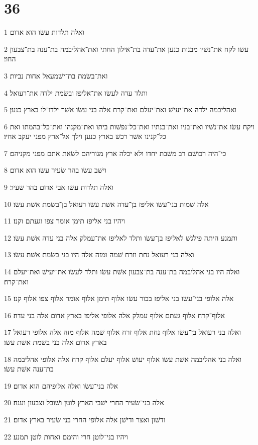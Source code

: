 \chapter{36}

\par 1 ואלה תלדות עשׂו הוא אדום׃
\par 2 עשׂו לקח את־נשׁיו מבנות כנען את־עדה בת־אילון החתי ואת־אהליבמה בת־ענה בת־צבעון החוי׃
\par 3 ואת־בשׂמת בת־ישׁמעאל אחות נביות׃
\par 4 ותלד עדה לעשׂו את־אליפז ובשׂמת ילדה את־רעואל׃
\par 5 ואהליבמה ילדה את־יעישׁ ואת־יעלם ואת־קרח אלה בני עשׂו אשׁר ילדו־לו בארץ כנען׃
\par 6 ויקח עשׂו את־נשׁיו ואת־בניו ואת־בנתיו ואת־כל־נפשׁות ביתו ואת־מקנהו ואת־כל־בהמתו ואת כל־קנינו אשׁר רכשׁ בארץ כנען וילך אל־ארץ מפני יעקב אחיו׃
\par 7 כי־היה רכושׁם רב משׁבת יחדו ולא יכלה ארץ מגוריהם לשׂאת אתם מפני מקניהם׃
\par 8 וישׁב עשׂו בהר שׂעיר עשׂו הוא אדום׃
\par 9 ואלה תלדות עשׂו אבי אדום בהר שׂעיר׃
\par 10 אלה שׁמות בני־עשׂו אליפז בן־עדה אשׁת עשׂו רעואל בן־בשׂמת אשׁת עשׂו׃
\par 11 ויהיו בני אליפז תימן אומר צפו וגעתם וקנז׃
\par 12 ותמנע היתה פילגשׁ לאליפז בן־עשׂו ותלד לאליפז את־עמלק אלה בני עדה אשׁת עשׂו׃
\par 13 ואלה בני רעואל נחת וזרח שׁמה ומזה אלה היו בני בשׂמת אשׁת עשׂו׃
\par 14 ואלה היו בני אהליבמה בת־ענה בת־צבעון אשׁת עשׂו ותלד לעשׂו את־יעישׁ ואת־יעלם ואת־קרח׃
\par 15 אלה אלופי בני־עשׂו בני אליפז בכור עשׂו אלוף תימן אלוף אומר אלוף צפו אלוף קנז׃
\par 16 אלוף־קרח אלוף געתם אלוף עמלק אלה אלופי אליפז בארץ אדום אלה בני עדה׃
\par 17 ואלה בני רעואל בן־עשׂו אלוף נחת אלוף זרח אלוף שׁמה אלוף מזה אלה אלופי רעואל בארץ אדום אלה בני בשׂמת אשׁת עשׂו׃
\par 18 ואלה בני אהליבמה אשׁת עשׂו אלוף יעושׁ אלוף יעלם אלוף קרח אלה אלופי אהליבמה בת־ענה אשׁת עשׂו׃
\par 19 אלה בני־עשׂו ואלה אלופיהם הוא אדום׃
\par 20 אלה בני־שׂעיר החרי ישׁבי הארץ לוטן ושׁובל וצבעון וענה׃
\par 21 ודשׁון ואצר ודישׁן אלה אלופי החרי בני שׂעיר בארץ אדום׃
\par 22 ויהיו בני־לוטן חרי והימם ואחות לוטן תמנע׃

